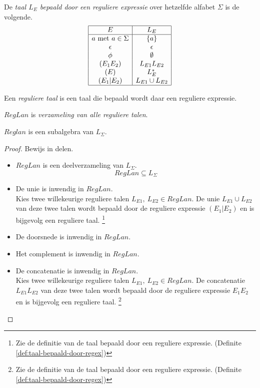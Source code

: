 \documentclass[main.tex]{subfiles}
\begin{document}
\begin{de}
  \label{def:taal-bepaald-door-regex}
  De \emph{taal $L_E$ bepaald door een reguliere expressie} over hetzelfde alfabet $\Sigma$ is de volgende.
  \[
  \begin{array}{|c|c|}
    \hline
    E & L_E\\
    \hline
    a \text{ met } a \in \Sigma & \{a\}\\
    \epsilon & {\epsilon}\\
    \phi & \emptyset\\
    (E_1E_2) & L_{E1}L_{E2}\\
    (E) & L_E^*\\
    (E_1|E_2) & L_{E1} \cup L_{E2}\\
    \hline
  \end{array}
  \]
\end{de}

\begin{de}
  Een \emph{reguliere taal} is een taal die bepaald wordt daar een reguliere expressie.
\end{de}

\begin{de}
  $RegLan$ is \emph{verzameling van alle reguliere talen}.
\end{de}

\begin{ei}
  $Reglan$ is een subalgebra van $L_{\Sigma}$.
  \begin{proof}
    Bewijs in delen.
    \begin{itemize}
    \item $RegLan$ is een deelverzameling van $L_{\Sigma}$.
      \[ RegLan \subseteq L_{\Sigma} \]
    \item De unie is inwendig in $RegLan$.\\
      Kies twee willekeurige reguliere talen $L_{E1},\ L_{E2} \in RegLan$.
      De unie $L_{E1} \cup L_{E2}$ van deze twee talen wordt bepaald door de reguliere expressie $(E_1|E_2)$ en is bijgevolg een reguliere taal.
      \footnote{Zie de definitie van de taal bepaald door een reguliere expressie. (Definite \ref{def:taal-bepaald-door-regex})}
    \item De doorsnede is inwendig in $RegLan$.
    \item Het complement is inwendig in $RegLan$.
    \item De concatenatie is inwendig in $RegLan$.\\
      Kies twee willekeurige reguliere talen $L_{E1},\ L_{E2} \in RegLan$.
      De concatenatie $L_{E1}L_{E2}$ van deze twee talen wordt bepaald door de reguliere expressie $E_1E_2$ en is bijgevolg een reguliere taal.
      \footnote{Zie de definitie van de taal bepaald door een reguliere expressie. (Definite \ref{def:taal-bepaald-door-regex})}
    \end{itemize}
  \end{proof}
\end{ei}
\end{document}
